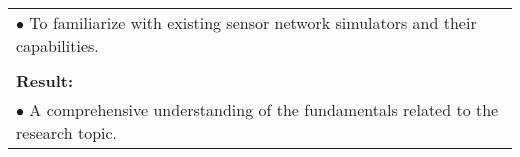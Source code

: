 \begin{table}[!h]
\begin{center}
\begin{tabular}{|p{35mm}||p{55mm}|p{50mm}||p{40mm}|}
      \multicolumn{4}{|p{150mm}|}{$\bullet$ To familiarize with existing sensor network simulators and their capabilities.} \\
      \multicolumn{4}{|p{150mm}|}{}                                                                                                                                                                           \\
      \multicolumn{4}{|p{150mm}|}{\textbf{Result:}}                                                                                                                                                       \\
      \multicolumn{4}{|p{150mm}|}{$\bullet$ A comprehensive understanding of the fundamentals related to the research topic.}                                                                                                                          \\
      \hline
    \end{tabular}
  \end{center}
\end{table}

\clearpage

